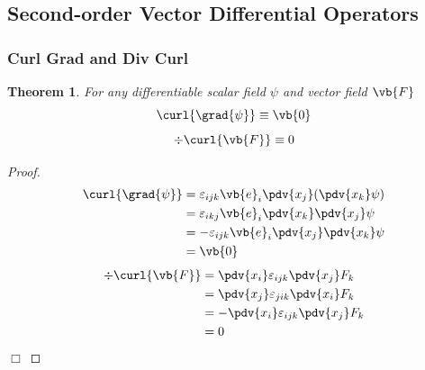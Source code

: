 \documentclass{article}
\theoremstyle{plain}\theoremheaderfont{\normalfont\itshape}\theorembodyfont{\rmfamily}\theoremseparator{.}\newtheorem*{rem}{Remark}\newtheorem*{ex}{Example}\newtheorem*{proof}{Proof}\newtheorem*{altp}{Alternative proof}
\theoremstyle{plain}\theoremheaderfont{\normalfont\bfseries}\theorembodyfont{\rmfamily}\theoremseparator{.}\newtheorem{thm}{Theorem}[section]\newtheorem{lem}[thm]{Lemma}\newtheorem{prop}[thm]{Proposition}\newtheorem*{cor}{Corollary}\newtheorem{defn}[thm]{Definition}\newtheorem{clm}[thm]{Claim}\newtheorem{clminproof}{Claim}
\theoremstyle{break}\theoremheaderfont{\normalfont\itshape}\theorembodyfont{\rmfamily}\theoremseparator{.\medskip}\newtheorem*{proofskip}{Proof}\newtheorem*{exs}{Examples}\newtheorem*{rems}{Remarks}
\theoremstyle{break}\theoremheaderfont{\normalfont\bfseries}\theorembodyfont{\rmfamily}\theoremseparator{.\medskip}\newtheorem{lemskip}[thm]{Lemma}\newtheorem{defnskip}[thm]{Definition}\newtheorem{propskip}[thm]{Proposition}\newtheorem{thmskip}[thm]{Theorem}
\numberwithin{equation}{section}
\newcommand{\qed}{\hfill\ensuremath{\Box}}
\begin{document}
	\subsection{Second-order Vector Differential Operators}
	\subsubsection{Curl Grad and Div Curl}
	\begin{thm}\label{curlgrad}
		For any differentiable scalar field \(\psi\) and vector field \(\vb{F}\)
		\[\curl{\grad{\psi}}\equiv\vb{0}\]
		\[\div{\curl{\vb{F}}}\equiv 0\]
	\end{thm}
	
	\begin{proof}
		\begin{align*}
			\curl{\grad{\psi}}&=\varepsilon_{ijk}\vb{e}_i\pdv{x_j} (\pdv{x_k} \psi)\\
			&=\varepsilon_{ikj}\vb{e}_i\pdv{x_k}\pdv{x_j}\psi\\
			&=-\varepsilon_{ijk}\vb{e}_i\pdv{x_j}\pdv{x_k}\psi\\
			&=\vb{0}
		\end{align*}
		\begin{align*}
			\div{\curl{\vb{F}}}&=\pdv{x_i}\varepsilon_{ijk}\pdv{x_j}F_k\\
			&=\pdv{x_j}\varepsilon_{jik}\pdv{x_i}F_k\\
			&=-\pdv{x_i}\varepsilon_{ijk}\pdv{x_j}F_k\\
			&=0
		\end{align*}
		\qed
	\end{proof}
	
\end{document}
